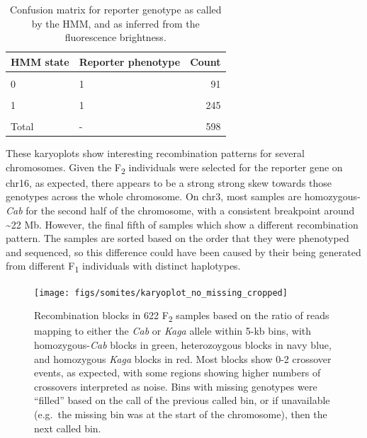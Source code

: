 \documentclass[
]{book}
\begin{document}
\begin{table}

\caption{\label{tab:reporter-conc-tbl}Confusion matrix for reporter genotype as called by the HMM, and as inferred from the fluorescence brightness.}
\centering
\begin{tabular}[t]{llr}
\toprule
HMM state & Reporter phenotype & Count\\
\midrule
\cellcolor{gray!6}{0} & \cellcolor{gray!6}{0} & \cellcolor{gray!6}{252}\\
0 & 1 & 91\\
\cellcolor{gray!6}{1} & \cellcolor{gray!6}{0} & \cellcolor{gray!6}{9}\\
1 & 1 & 245\\
\cellcolor{gray!6}{2} & \cellcolor{gray!6}{1} & \cellcolor{gray!6}{1}\\
\addlinespace
Total & - & 598\\
\bottomrule
\end{tabular}
\end{table}

These karyoplots show interesting recombination patterns for several chromosomes. Given the F\textsubscript{2} individuals were selected for the reporter gene on chr16, as expected, there appears to be a strong strong skew towards those genotypes across the whole chromosome. On chr3, most samples are homozygous-\emph{Cab} for the second half of the chromosome, with a consistent breakpoint around \textasciitilde22 Mb. However, the final fifth of samples which show a different recombination pattern. The samples are sorted based on the order that they were phenotyped and sequenced, so this difference could have been caused by their being generated from different F\textsubscript{1} individuals with distinct haplotypes.



\begin{figure}
\texttt{[image: figs/somites/karyoplot\_no\_missing\_cropped]} \caption{Recombination blocks in 622 F\textsubscript{2} samples based on the ratio of reads mapping to either the \emph{Cab} or \emph{Kaga} allele within 5-kb bins, with homozygous-\emph{Cab} blocks in green, heterozoygous blocks in navy blue, and homozygous \emph{Kaga} blocks in red. Most blocks show 0-2 crossover events, as expected, with some regions showing higher numbers of crossovers interpreted as noise. Bins with missing genotypes were ``filled'' based on the call of the previous called bin, or if unavailable (e.g.~the missing bin was at the start of the chromosome), then the next called bin.}\label{fig:karyo-no-missing}
\end{figure}
\end{document}
